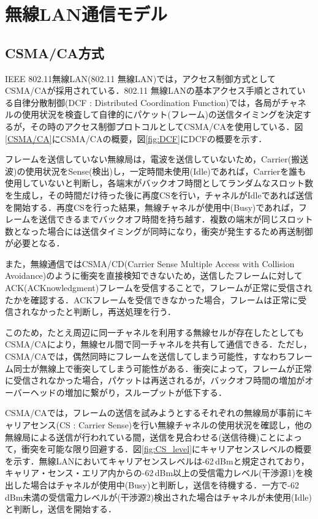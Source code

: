 \documentclass[a4paper,10pt]{ltjsarticle}
\begin{document}
\section{無線LAN通信モデル}

\subsection{CSMA/CA方式}


IEEE 802.11無線LAN(802.11 無線LAN)では，アクセス制御方式としてCSMA/CAが採用されている．802.11 無線LANの基本アクセス手順とされている自律分散制御(DCF : Distributed Coordination Function)では，各局がチャネルの使用状況を検査して自律的にパケット(フレーム)の送信タイミングを決定するが，その時のアクセス制御プロトコルとしてCSMA/CAを使用している．図\ref{CSMA/CA}にCSMA/CAの概要，図\ref{fig:DCF}にDCFの概要を示す．

フレームを送信していない無線局は，電波を送信していないため，Carrier(搬送波)の使用状況をSense(検出)し，一定時間未使用(Idle)であれば，Carrierを誰も使用していないと判断し，各端末がバックオフ時間としてランダムなスロット数を生成し，その時間だけ待った後に再度CSを行い，チャネルがIdleであれば送信を開始する．再度CSを行った結果，無線チャネルが使用中(Busy)であれば，フレームを送信できるまでバックオフ時間を持ち越す．複数の端末が同じスロット数となった場合には送信タイミングが同時になり，衝突が発生するため再送制御が必要となる．

また，無線通信ではCSMA/CD(Carrier Sense Multiple Access with Collision Avoidance)のように衝突を直接検知できないため，送信したフレームに対してACK(ACKnowledgment)フレームを受信することで，フレームが正常に受信されたかを確認する．ACKフレームを受信できなかった場合，フレームは正常に受信されなかったと判断し，再送処理を行う．

このため，たとえ周辺に同一チャネルを利用する無線セルが存在したとしてもCSMA/CAにより，無線セル間で同一チャネルを共有して通信できる．ただし，CSMA/CAでは，偶然同時にフレームを送信してしまう可能性，すなわちフレーム同士が無線上で衝突してしまう可能性がある．衝突によって，フレームが正常に受信されなかった場合，パケットは再送されるが，バックオフ時間の増加がオーバーヘッドの増加に繋がり，スループットが低下する．

CSMA/CAでは，フレームの送信を試みようとするそれぞれの無線局が事前にキャリアセンス(CS : Carrier Sense)を行い無線チャネルの使用状況を確認し，他の無線局による送信が行われている間，送信を見合わせる(送信待機)ことによって，衝突を可能な限り回避する．図\ref{fig:CS_level}にキャリアセンスレベルの概要を示す．無線LANにおいてキャリアセンスレベルは-62\,dBmと規定されており，キャリア・センス・エリア内からの-62\,dBm以上の受信電力レベル(干渉源1)を検出した場合はチャネルが使用中(Busy)と判断し，送信を待機する．一方で-62\,dBm未満の受信電力レベルが(干渉源2)検出された場合はチャネルが未使用(Idle)と判断し，送信を開始する．
\end{document}
